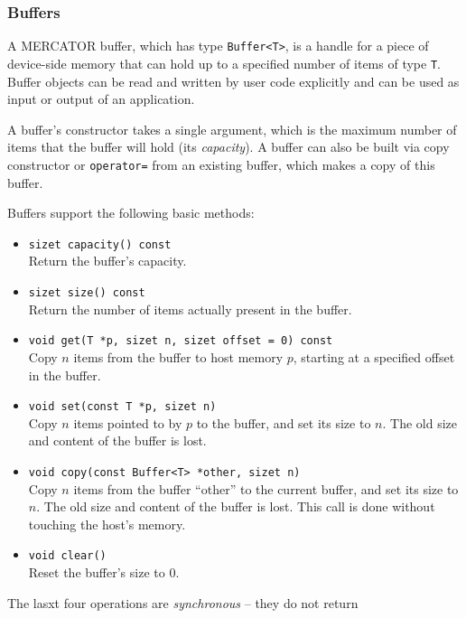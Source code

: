 \documentclass[11pt]{article}
\newcommand{\sizet}{size\textunderscore{}t}
\begin{document}
\subsubsection{Buffers}

A MERCATOR buffer, which has type \texttt{Buffer<T>}, is a handle for a
piece of device-side memory that can hold up to a specified number of
items of type \texttt{T}.  Buffer objects can be read and written
by user code explicitly and can be used as input or output of
an application.

A buffer's constructor takes a single argument, which is the maximum
number of items that the buffer will hold (its \textit{capacity}).  A
buffer can also be built via copy constructor or \texttt{operator=}
from an existing buffer, which makes a copy of this buffer.

Buffers support the following basic methods:
\begin{itemize}
\item \texttt{\sizet{} capacity() const} \\
  Return the buffer's capacity.
  
\item \texttt{\sizet{} size() const} \\
  Return the number of items actually present in the buffer.

\item \texttt{void get(T *p, \sizet{} n, \sizet{} offset = 0) const} \\
  Copy $n$ items from the buffer to host memory $p$, starting at
  a specified offset in the buffer.

\item \texttt{void set(const T *p, \sizet{} n)} \\
  Copy $n$ items pointed to by $p$ to the buffer, and set its size to $n$.
  The old size and content of the buffer is lost. 

\item \texttt{void copy(const Buffer<T> *other, \sizet{} n)} \\
  Copy $n$ items from the buffer ``other'' to the current buffer, and set
  its size to $n$. The old size and content of the buffer is lost. 
  This call is done without touching the host's memory.

\item \texttt{void clear()} \\
  Reset the buffer's size to 0.

\end{itemize}
The lasxt four operations are \emph{synchronous} -- they do not return
\end{document}
